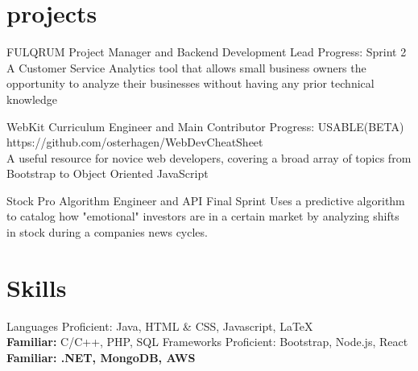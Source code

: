 \documentclass[]{friggeri-cv} %
\begin{document}
\vspace{-5pt}
\section{projects}

\begin{entrylist}


\entry
{FULQRUM}
{Project Manager and Backend Development Lead}
{Progress: Sprint 2}
{A Customer Service Analytics tool that allows small business owners the opportunity to analyze their businesses without having any prior technical knowledge}


\entry
{WebKit}
{Curriculum Engineer and Main Contributor}
{Progress: USABLE(BETA)}
{https://github.com/osterhagen/WebDevCheatSheet \\ A useful resource for novice web developers, covering a broad array of topics from Bootstrap to Object Oriented JavaScript}

\entry
{Stock Pro}
{Algorithm Engineer and API }
{Final Sprint}
{Uses a predictive algorithm to catalog how "emotional" investors are in a certain market by analyzing shifts in stock during a companies news cycles.}

\end{entrylist}
\vspace{-10pt}
\section{Skills}
\begin{entrylist}

\entry
{Languages}
{Proficient: \normalfont Java, HTML \& CSS, Javascript, LaTeX \\\textbf{Familiar:} C/C++, PHP, SQL }
{}
{}
\vspace{-5pt}
\entry
{Frameworks}
{Proficient: \normalfont Bootstrap, Node.js,  React  \\ \textbf{Familiar: \normalfont .NET, MongoDB, AWS}}
{}
{}
\end{entrylist}
\end{document}
